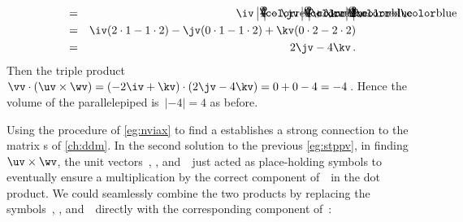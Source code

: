 \begin{example}
\begin{solution}
\begin{eqnarray*}
\\&=&\iv\ab2211
-\jv\ab0211
+\kv\ab0222
\\&=&\iv(2\cdot1-1\cdot2)
-\jv(0\cdot1-1\cdot2)
+\kv(0\cdot2-2\cdot2)
\\&=&2\jv-4\kv\,.
\end{eqnarray*}
Then the triple product \(\vv\cdot(\uv\times\wv)=(-2\iv+\kv)\cdot(2\jv-4\kv)=0+0-4=-4\)\,.
Hence the volume of the parallelepiped is~\(|-4|=4\) as before.
\end{solution}
\end{example}



Using the procedure of \cref{eg:nviax} to find a  establishes a strong connection to the matrix s of \cref{ch:ddm}.
%
In the second solution to the previous \cref{eg:stppv}, in finding \(\uv\times\wv\), the unit vectors~\iv, \jv, and~\kv\  just acted as place-holding symbols to eventually ensure a multiplication by the correct component of~\vv\ in the dot product.
We could seamlessly combine the two products by replacing the symbols~\iv, \jv, and~\kv\ directly with the corresponding component of~\vv:
